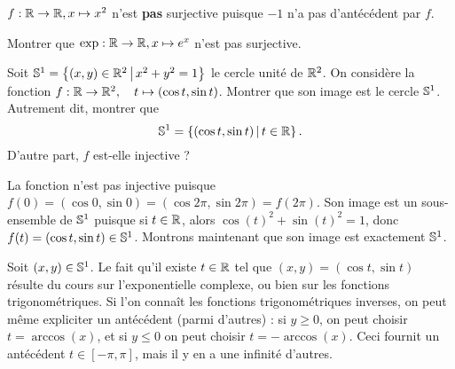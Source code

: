 \begin{exemple}
$f : \R\to \R, x\mapsto x^2$ n'est \textbf{pas} surjective puisque $-1$ n'a pas d'antécédent par $f$.
\end{exemple}

\begin{exercice}
Montrer que  $\exp: \R\to \R, x\mapsto e^x$ n'est pas surjective.
\end{exercice}


\begin{exercice}\label{exo-param-cercle}
Soit $\S^1 = \ensemble{(x,y)\in \R^2}{x^2+y^2=1}$ le cercle unité de $\R^2$. On considère la fonction $f : \R\to \R^2, \quad t\mapsto (\cos t, \sin t)$. Montrer que son image est le cercle $\S^1$. Autrement dit, montrer que
\[ \S^1=\ensemble{(\cos t, \sin t)}{t\in \R}.\]
D'autre part, $f$ est-elle injective ?
\end{exercice}
\begin{red}
La fonction n'est pas injective puisque $f(0)=(\cos 0, \sin 0) = (\cos2\pi, \sin 2\pi) = f(2\pi)$. Son image est un sous-ensemble de $\S^1$ puisque si $t\in \R$, alors $\cos(t)^2+\sin(t)^2=1$, donc $f(t)=(\cos t,\sin t) \in \S^1$. Montrons maintenant que son image est exactement $\S^1$.

Soit $(x,y)\in \S^1$. Le fait qu'il existe $t\in \R$ tel que $(x,y)=(\cos t,\sin t) $ résulte du cours sur l'exponentielle complexe, ou bien sur les fonctions trigonométriques. Si l'on connaît les fonctions trigonométriques inverses, on peut même expliciter un antécédent (parmi d'autres) : si $y\geq 0$, on peut choisir $t=\arccos(x)$, et si $y\leq 0$ on peut choisir $t=-\arccos(x)$. Ceci fournit un antécédent $t\in [-\pi,\pi]$, mais il y en a une infinité d'autres.
\end{red}


